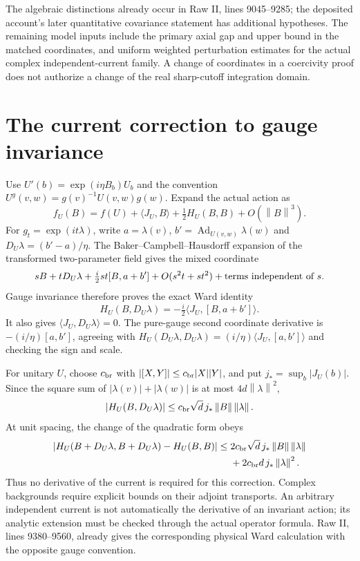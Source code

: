 \documentclass[11pt]{article}
\theoremstyle{remark}
\newcommand{\norm}[1]{\left\|#1\right\|}
\newcommand{\Ad}{\operatorname{Ad}}
\begin{document}
The algebraic distinctions already occur in Raw II, lines 9045--9285;
the deposited account's later quantitative covariance statement has
additional hypotheses. The remaining model inputs include the primary
axial gap and upper bound in the matched coordinates, and uniform
weighted perturbation estimates for the actual complex independent-current
family. A change of coordinates in a coercivity proof does not authorize
a change of the real sharp-cutoff integration domain.

\section{The current correction to gauge invariance}

Use $U'(b)=\exp(i\eta B_b)U_b$ and the convention
$U^g(v,w)=g(v)^{-1}U(v,w)g(w)$. Expand the actual action as
\[
 f_U(B)=f(U)+\langle J_U,B\rangle+\tfrac12H_U(B,B)+O(\norm B^3).
\]
For $g_t=\exp(it\lambda)$, write $a=\lambda(v)$,
$b'=\Ad_{U(v,w)}\lambda(w)$ and
$D_U\lambda=(b'-a)/\eta$. The Baker--Campbell--Hausdorff expansion
of the transformed two-parameter field gives the mixed coordinate
\[
 sB+tD_U\lambda+\tfrac{i}{2}st[B,a+b']
       +O(s^2t+st^2)+\hbox{terms independent of }s.
\]
Gauge invariance therefore proves the exact Ward identity
\begin{equation}\label{eq:ward}
 H_U(B,D_U\lambda)=-\tfrac{i}{2}
                 \langle J_U,[B,a+b']\rangle.
\end{equation}
It also gives $\langle J_U,D_U\lambda\rangle=0$.
The pure-gauge second coordinate derivative is
$-(i/\eta)[a,b']$, agreeing with
$H_U(D_U\lambda,D_U\lambda)=(i/\eta)
\langle J_U,[a,b']\rangle$ and checking the sign and scale.

For unitary $U$, choose $c_{\rm br}$ with
$|[X,Y]|\le c_{\rm br}|X||Y|$, and put
$j_* =\sup_b|J_U(b)|$. Since the square sum of
$|\lambda(v)|+|\lambda(w)|$ is at most $4d\norm\lambda^2$,
\[
 |H_U(B,D_U\lambda)|
 \le c_{\rm br}\sqrt d\,j_*\norm B\norm\lambda.
\]
At unit spacing, the change of the quadratic form obeys
\begin{align*}
 |H_U(B+D_U\lambda,B+D_U\lambda)-H_U(B,B)|
 \le{}&2c_{\rm br}\sqrt d\,j_*\norm B\norm\lambda\\
 &+2c_{\rm br}d\,j_*\norm\lambda^2.
\end{align*}
Thus no derivative of the current is required for this correction.
Complex backgrounds require explicit bounds on their adjoint transports.
An arbitrary independent current is not automatically the derivative
of an invariant action; its analytic extension must be checked through
the actual operator formula. Raw II, lines 9380--9560, already gives
the corresponding physical Ward calculation with the opposite gauge
convention.
\end{document}
